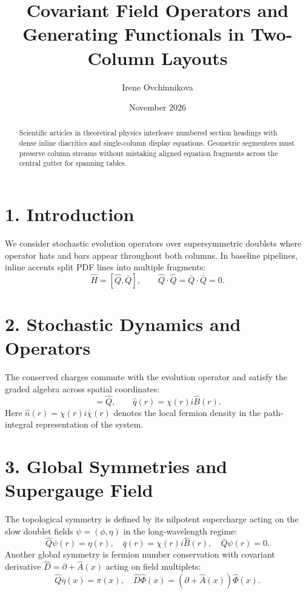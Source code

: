 \documentclass[10pt,twocolumn]{article}
\title{\textbf{Covariant Field Operators and Generating Functionals in Two-Column Layouts}}
\author{Irene Ovchinnikova}
\date{November 2026}
\begin{document}
\maketitle

\begin{abstract}
Scientific articles in theoretical physics interleave numbered section headings with dense inline diacritics and single-column display equations. Geometric segmenters must preserve column streams without mistaking aligned equation fragments across the central gutter for spanning tables.
\end{abstract}

\section*{1. Introduction}
We consider stochastic evolution operators over supersymmetric doublets where operator hats and bars appear throughout both columns. In baseline pipelines, inline accents split PDF lines into multiple fragments:
\begin{equation}
\hat{H} = [\hat{Q}, \bar{Q}], \qquad \hat{Q} \cdot \hat{Q} = \bar{Q} \cdot \bar{Q} = 0.
\end{equation}

\section*{2. Stochastic Dynamics and Operators}
The conserved charges commute with the evolution operator and satisfy the graded algebra across spatial coordinates:
\begin{equation}
[\hat{N}, \hat{Q}] = \hat{Q}, \qquad \hat{q}(r) = \chi(r) i \hat{B}(r).
\end{equation}
Here $\hat{n}(r) = \chi(r) i \bar{\chi}(r)$ denotes the local fermion density in the path-integral representation of the system.

\clearpage
\section*{3. Global Symmetries and Supergauge Field}
The topological symmetry is defined by its nilpotent supercharge acting on the slow doublet fields $\psi = (\phi, \eta)$ in the long-wavelength regime:
\begin{equation}
\hat{Q} \psi(r) = \eta(r), \quad \bar{q}(r) = \chi(r) i \hat{B}(r), \quad \bar{Q}\psi(r) = 0.
\end{equation}
Another global symmetry is fermion number conservation with covariant derivative $\hat{D} = \partial + \hat{A}(x)$ acting on field multiplets:
\begin{equation}
\hat{Q}\bar{\eta}(x) = \pi(x), \quad \hat{D}\hat{\Phi}(x) = (\partial + \hat{A}(x))\hat{\Phi}(x).
\end{equation}
\end{document}
